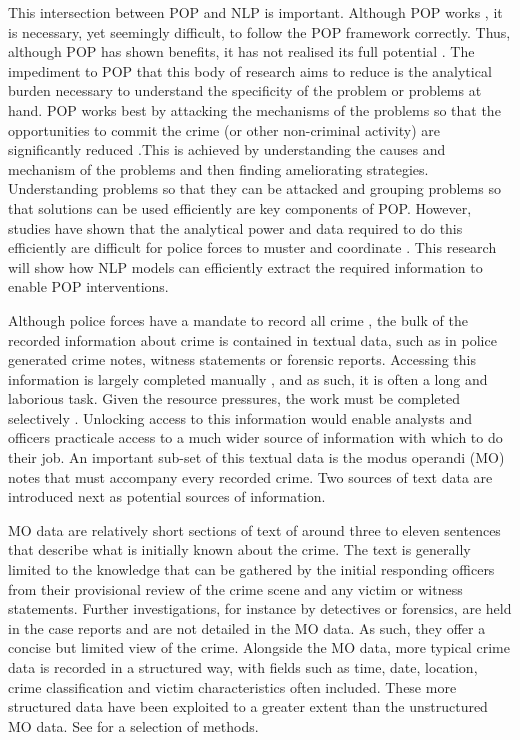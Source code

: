 This intersection between POP and NLP is important. Although POP works \parencite{hinkle2020problem}, it is necessary, yet seemingly difficult, to follow the POP framework correctly. Thus, although POP has shown benefits, it has not realised its full potential \parencite{POPUCL}. The impediment to POP that this body of research aims to reduce is the analytical burden necessary to understand the specificity of the problem or problems at hand. POP works best by attacking the mechanisms of the problems so that the opportunities to commit the crime (or other non-criminal activity) are significantly reduced \parencite{clarke2003becoming}.This is achieved by understanding the causes and mechanism of the problems and then finding ameliorating strategies. Understanding problems so that they can be attacked and grouping problems so that solutions can be used efficiently are key components of POP. However, studies have shown that the analytical power and data required to do this efficiently are difficult for police forces to muster and coordinate \parencite{sidebottom2020implementing}. This research will show how NLP models can efficiently extract the required information to enable POP interventions. 

Although police forces have a mandate to record all crime \parencite{home2020crime}, the bulk of the recorded information about crime is contained in textual data, such as in police generated crime notes, witness statements or forensic reports. Accessing this information is largely completed manually \parencite{goldstein1990}, and as such, it is often a long and laborious task. Given the resource pressures, the work must be completed selectively \parencite{rogerson2016utility}. Unlocking access to this information would enable analysts and officers practicale access to a much wider source of information with which to do their job. An important sub-set of this textual data is the modus operandi (MO) notes that must accompany every recorded crime. Two sources of text data are introduced next as potential sources of information.

MO data are relatively short sections of text of around three to eleven sentences that describe what is initially known about the crime. The text is generally limited to the knowledge that can be gathered by the initial responding officers from their provisional review of the crime scene and any victim or witness statements. Further investigations, for instance by detectives or forensics, are held in the case reports and are not detailed in the MO data. As such, they offer a concise but limited view of the crime. Alongside the MO data, more typical crime data is recorded in a structured way, with fields such as time, date, location, crime classification and victim characteristics often included. These more structured data have been exploited to a greater extent than the unstructured MO data. See \textcite{mapchap10, ratcliffe1998aoristic, braga2014effects, weisel2016analyzing} for a selection of methods.

